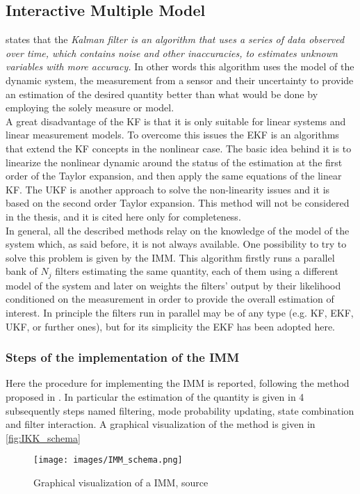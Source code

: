 \subsection{Interactive Multiple Model}\label{subsec:IMM}
\cite{Kalman_Filter_and_Its_Application} states that the \textit{Kalman filter is an algorithm that uses a series of data observed over time, which contains noise and other inaccuracies, to estimates unknown variables with more accuracy.} In other words this algorithm uses the model of the dynamic system, the measurement from a sensor and their uncertainty to provide an estimation of the desired quantity better than what would be done by employing the solely measure or model.\\
 A great disadvantage of the \acrfull{KF} is that it is only suitable for linear systems and linear measurement models. To overcome this issues the \acrfull{EKF} is an algorithms that extend the KF concepts in the nonlinear case. The basic idea behind it is to linearize the nonlinear dynamic around the status of the estimation at the first order of the Taylor expansion, and then apply the same equations of the linear \acrshort{KF}. The \acrfull{UKF} is another approach to solve the non-linearity issues and it is based on the second order Taylor expansion. This method will not be considered in the thesis, and it is cited here only for completeness.\\
In general, all the described methods relay on the knowledge of the model of the system which, as said before, it is not always available. One possibility to try to solve this problem is given by the \acrshort{IMM}. This algorithm firstly runs a parallel bank of $N_j$ filters estimating the same quantity, each of them using a different model of the system and later on weights the filters' output by their likelihood conditioned on the measurement in order to provide the overall estimation of interest. In principle the filters run in parallel may be of any type (e.g. KF, EKF, UKF, or further ones), but for its simplicity the EKF has been adopted here. 

\subsubsection{Steps of the implementation of the IMM}
Here the procedure for implementing the IMM is reported, following the method proposed in \cite{kalman_based_IMM}. In particular the estimation of the quantity is given in 4 subsequently steps named filtering, mode probability updating, state combination and filter interaction. A graphical visualization of the method is given in \autoref{fig:IKK_schema}
\begin{figure}[H]
  \centering
  \texttt{[image: images/IMM\_schema.png]}
  \caption{Graphical visualization of a IMM, source \cite{kalman_based_IMM}}
  \label{fig:IKK_schema}
\end{figure}

